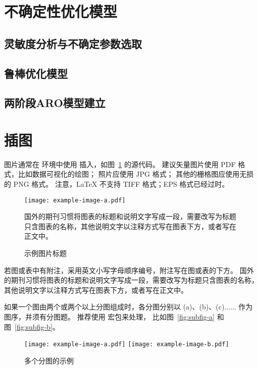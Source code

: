 \section{不确定性优化模型}
\subsection{灵敏度分析与不确定参数选取}
\subsection{鲁棒优化模型}
\subsection{两阶段ARO模型建立}


\section{插图}

图片通常在  环境中使用  插入，如图~\ref{fig:example} 的源代码。
建议矢量图片使用 PDF 格式，比如数据可视化的绘图；
照片应使用 JPG 格式；
其他的栅格图应使用无损的 PNG 格式。
注意，LaTeX 不支持 TIFF 格式；EPS 格式已经过时。

\begin{figure}
  \centering
  \texttt{[image: example-image-a.pdf]}
  \caption*{国外的期刊习惯将图表的标题和说明文字写成一段，需要改写为标题只含图表的名称，其他说明文字以注释方式写在图表下方，或者写在正文中。}
  \caption{示例图片标题}
  \label{fig:example}
\end{figure}

若图或表中有附注，采用英文小写字母顺序编号，附注写在图或表的下方。
国外的期刊习惯将图表的标题和说明文字写成一段，需要改写为标题只含图表的名称，其他说明文字以注释方式写在图表下方，或者写在正文中。

如果一个图由两个或两个以上分图组成时，各分图分别以 (a)、(b)、(c)...... 作为图序，并须有分图题。
推荐使用  宏包来处理， 比如图~\ref{fig:subfig-a} 和图~\ref{fig:subfig-b}。

\begin{figure}
  \centering
    {\texttt{[image: example-image-a.pdf]}}
    {\texttt{[image: example-image-b.pdf]}}
  \caption{多个分图的示例}
  \label{fig:multi-image}
\end{figure}



